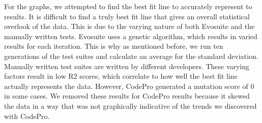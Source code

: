 For the graphs, we attempted to find the best fit line to accurately represent to results. It is difficult to find a truly best fit line that gives an overall statistical overlook of the data. This is due to the varying nature of both Evosuite and the manually written tests. Evosuite uses a genetic algorithm, which results in varied results for each iteration. This is why as mentioned before, we run ten generations of the test suites and calculate an average for the standard deviation. Manually written test suites are written by different developers. These varying factors result in low  R2 scores, which correlate to how well the best fit line actually represents the data. However, CodePro generated a mutation score of 0 in some cases. We removed these results for CodePro results because it skewed the data in a way that was not graphically indicative of the trends we discovered with CodePro. 


